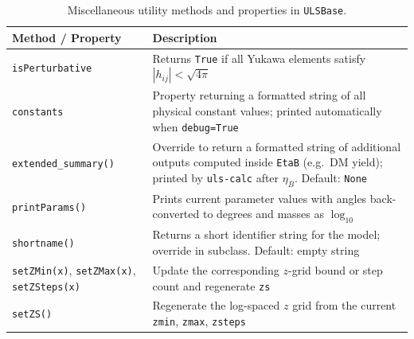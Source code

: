 \documentclass[12pt, a4paper]{article}
\begin{document}
\begin{table}[H]
\centering\small
\renewcommand{\arraystretch}{1.25}
\begin{tabular}{p{4.8cm} p{9.2cm}}
\hline
\textbf{Method / Property} & \textbf{Description} \\
\hline
\texttt{isPerturbative}      & Returns \texttt{True} if all Yukawa elements satisfy
                               $|h_{ij}|<\sqrt{4\pi}$ \\
\texttt{constants}           & Property returning a formatted string of all physical
                               constant values; printed automatically when
                               \texttt{debug=True} \\
\texttt{extended\_summary()} & Override to return a formatted string of additional
                               outputs computed inside \texttt{EtaB}
                               (e.g.\ DM yield); printed by \texttt{uls-calc} after
                               $\eta_B$. Default: \texttt{None} \\
\texttt{printParams()}       & Prints current parameter values with angles
                               back-converted to degrees and masses as $\log_{10}$ \\
\texttt{shortname()}         & Returns a short identifier string for the model;
                               override in subclass. Default: empty string \\
\texttt{setZMin(x)}, \texttt{setZMax(x)}, \texttt{setZSteps(x)}
                             & Update the corresponding $z$-grid bound or step count
                               and regenerate \texttt{zs} \\
\texttt{setZS()}             & Regenerate the log-spaced $z$ grid from the current
                               \texttt{zmin}, \texttt{zmax}, \texttt{zsteps} \\
\hline
\end{tabular}
\caption{Miscellaneous utility methods and properties in \texttt{ULSBase}.}
\label{tab:ulsbase_misc}
\end{table}





\end{document}
